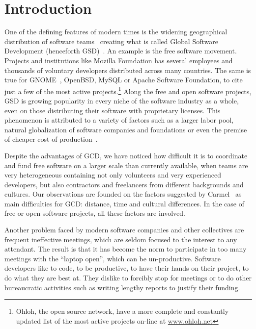 \documentclass[letterpaper]{article}
\newcommand{\indraftnote}[1]{\textcolor{blue}{\texttt{\footnotesize[#1]}}}
\newcommand{\todo}[1]{\indraftnote{todo: #1}}
\begin{document}


\section{Introduction}

One of the defining features of modern times is the widening
geographical distribution of software teams~\cite{last2003} creating
what is called Global Software Development (henceforth
GSD)~\cite{german2003}. An example is the free software
movement. Projects and institutions like Mozilla Foundation has several
employees and thousands of voluntary developers distributed across
many countries. The same is true for GNOME~\cite{german2003}, OpenBSD,
MySQL or Apache Software Foundation, to cite just a few of the most active
projects.\footnote{Ohloh, the open source network, have a more complete
  and constantly updated list of the most active projects on-line at
  \url{www.ohloh.net}} Along the free and open software
projects, GSD is growing popularity in every niche of the software
industry as a whole, even on those distributing their software with
proprietary licenses. This phenomenon is attributed to a variety of factors
such as a larger labor pool, natural globalization of software companies
and foundations or even the premise of cheaper cost of
production~\cite{komi2005}.

Despite the advantages of GCD, we have noticed how
difficult it is to coordinate and fund free software on a larger scale
than currently available, when teams are very heterogeneous containing
not only volunteers and very experienced developers, but also
contractors and freelancers from different backgrounds and cultures. Our observations
are founded on the factors suggested by Carmel~\cite{carmel1999} as
main difficulties for GCD: distance, time and cultural differences. In
the case of free or open software projects, all these factors are
involved.

Another problem faced by modern software companies and other
collectives are frequent ineffective meetings, which are seldom
focused to the interest to any attendant. The result is that it has
become the norm to participate in too many meetings with the ``laptop
open'', which can be un-productive. Software developers
like to code, to be productive, to have their hands on their project,
to do what they are best at. They dislike to forcibly stop for meetings
or to do other bureaucratic activities such as writing lengthy reports to
justify their funding.~\cite{Thompson:Wired:2012}
\end{document}
